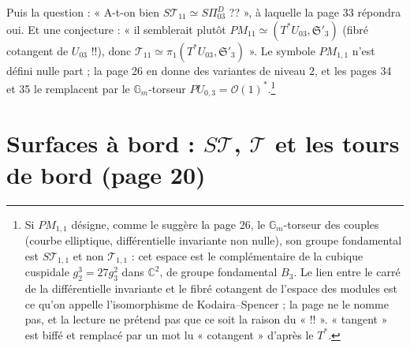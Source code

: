 \documentclass[11pt,a4paper]{article}
\begin{document}
Puis la question : « A-t-on bien $S\mathcal{T}_{11} \simeq S\Pi^{D}_{03}$ ?? », à
laquelle la page 33 répondra oui. Et une conjecture :
« il semblerait plutôt $PM_{11} \simeq (T^{*}U_{03}, \mathfrak{S}'_3)$ (fibré
cotangent de $U_{03}$ !!), donc $\mathcal{T}_{11} \simeq \pi_1(T^{*}U_{03},
\mathfrak{S}'_3)$ ». Le symbole $PM_{1,1}$ n'est défini nulle part ; la page 26
en donne des variantes de niveau $2$, et les pages 34 et 35 le remplacent par le
$\mathbb{G}_m$-torseur $PU_{0,3} = \mathcal{O}(1)^{*}$.\footnote{Si $PM_{1,1}$
désigne, comme le suggère la page 26, le $\mathbb{G}_m$-torseur des couples
(courbe elliptique, différentielle invariante non nulle), son groupe fondamental
est $S\mathcal{T}_{1,1}$ et non $\mathcal{T}_{1,1}$ : cet espace est le
complémentaire de la cubique cuspidale $g_2^3 = 27g_3^2$ dans $\mathbb{C}^2$, de
groupe fondamental $B_3$. Le lien entre le carré de la différentielle invariante
et le fibré cotangent de l'espace des modules est ce qu'on appelle
l'isomorphisme de Kodaira--Spencer ; la page ne le nomme pas, et la lecture ne
prétend pas que ce soit la raison du « !! ». « tangent » est biffé et remplacé
par un mot lu « cotangent » d'après le $T^{*}$.}

\section*{Surfaces à bord : $S\mathcal{T}$, $\mathcal{T}$ et les tours de bord (page 20)}
\end{document}
